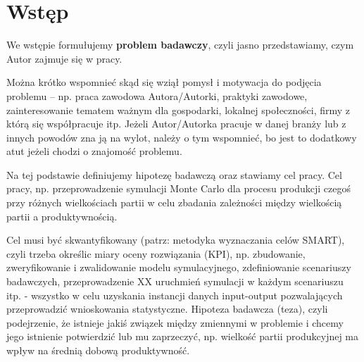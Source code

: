 \section*{Wstęp} 

We wstępie formułujemy \textbf{problem badawczy}, czyli jasno przedstawiamy, czym Autor zajmuje się w pracy.


Można krótko wspomnieć skąd się wziął pomysł i motywacja do podjęcia problemu -- np. praca zawodowa Autora/Autorki, praktyki zawodowe, zainteresowanie tematem ważnym dla gospodarki, lokalnej społeczności, firmy z którą się współpracuje itp. Jeżeli Autor/Autorka pracuje w danej branży lub z innych powodów zna ją na wylot, należy o tym wspomnieć, bo jest to dodatkowy atut jeżeli chodzi o znajomość problemu. 


Na tej podstawie definiujemy hipotezę badawczą oraz stawiamy cel pracy. Cel pracy, np. przeprowadzenie symulacji Monte Carlo dla procesu produkcji czegoś przy różnych wielkościach partii w celu zbadania zależności między wielkością partii a produktywnością.


Cel musi być skwantyfikowany (patrz: metodyka wyznaczania celów SMART), czyli trzeba określic miary oceny rozwiązania (KPI), np. zbudowanie, zweryfikowanie i zwalidowanie modelu symulacyjnego, zdefiniowanie scenariuszy badawczych, przeprowadzenie XX uruchmień symulacji w każdym scenariuszu itp. - wszystko w celu uzyskania instancji danych input-output pozwalających przeprowadzić wnioskowania statystyczne.
Hipoteza badawcza (teza), czyli podejrzenie, że istnieje jakiś związek między zmiennymi w problemie i chcemy jego istnienie potwierdzić lub mu zaprzeczyć, np. wielkość partii produkcyjnej ma wpływ na średnią dobową produktywność. 

